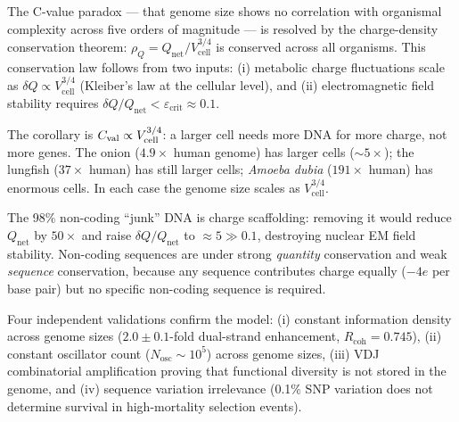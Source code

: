 \begin{chapterbox}
The C-value paradox --- that genome size shows no correlation with
organismal complexity across five orders of magnitude --- is resolved
by the charge-density conservation theorem: $\rho_Q = Q_{\mathrm{net}}
/ V_{\mathrm{cell}}^{3/4}$ is conserved across all organisms. This
conservation law follows from two inputs: (i) metabolic charge
fluctuations scale as $\delta Q \propto V_{\mathrm{cell}}^{3/4}$
(Kleiber's law at the cellular level), and (ii) electromagnetic field
stability requires $\delta Q / Q_{\mathrm{net}} <
\varepsilon_{\mathrm{crit}} \approx 0.1$.

The corollary is $C_{\mathrm{val}} \propto V_{\mathrm{cell}}^{3/4}$: a larger
cell needs more DNA for more charge, not more genes. The onion ($4.9\times$
human genome) has larger cells ($\sim 5\times$); the lungfish ($37\times$
human) has still larger cells; \textit{Amoeba dubia} ($191\times$ human)
has enormous cells. In each case the genome size scales as
$V_{\mathrm{cell}}^{3/4}$.

The 98\% non-coding ``junk'' DNA is charge scaffolding: removing it would
reduce $Q_{\mathrm{net}}$ by $50\times$ and raise $\delta Q / Q_{\mathrm{net}}$
to $\approx 5 \gg 0.1$, destroying nuclear EM field stability.
Non-coding sequences are under strong \emph{quantity} conservation and
weak \emph{sequence} conservation, because any sequence contributes
charge equally ($-4e$ per base pair) but no specific non-coding sequence
is required.

Four independent validations confirm the model: (i) constant information
density across genome sizes ($2.0 \pm 0.1$-fold dual-strand enhancement,
$R_{\mathrm{coh}} = 0.745$), (ii) constant oscillator count
($N_{\mathrm{osc}} \sim 10^5$) across genome sizes, (iii) VDJ
combinatorial amplification proving that functional diversity is not
stored in the genome, and (iv) sequence variation irrelevance
(0.1\% SNP variation does not determine survival in high-mortality
selection events).
\end{chapterbox}
